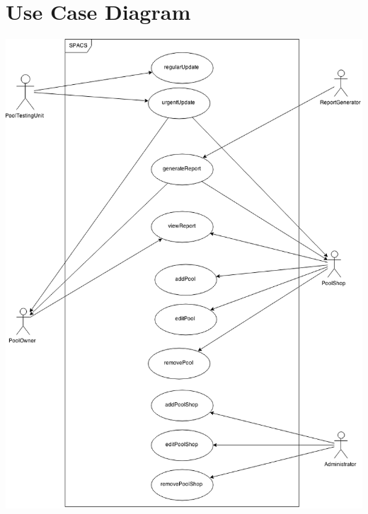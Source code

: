 \newcommand{\usecase}[7]{
\begin{center}
\begin{tabular}[h!]{| l | p{12cm} |}
	\hline
	\textbf{Name} & #1 \\ \hline
	\textbf{Actors} & #2 \\ \hline
	\textbf{Goal} & #3 \\ \hline
	\textbf{Preconditions} & #4 \\ \hline
	\textbf{Basic Flow} & #5 \\ \hline
	\textbf{Alternative Flow} & #6 \\ \hline
	\textbf{Postconditions} & #7 \\ \hline
\end{tabular}
\end{center}
}

\section{Use Case Diagram}

\begin{center}
	\includegraphics[width=15cm]{images/UseCaseDiagram}
\end{center}

